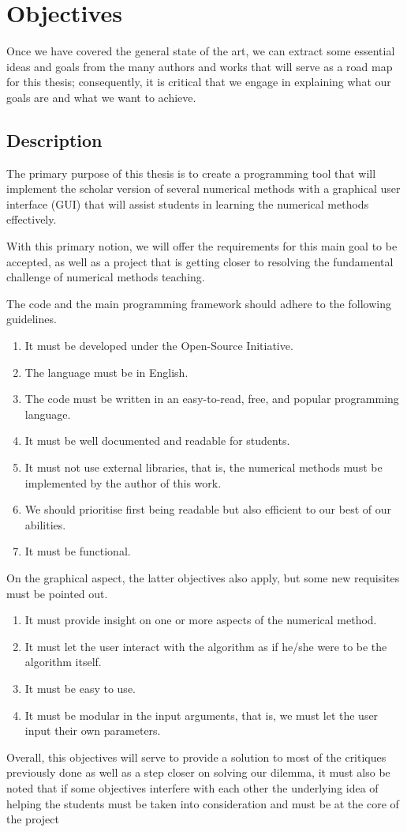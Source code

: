 \chapter{Objectives}
Once we have covered the general state of the art, we can extract some essential ideas and goals from the many authors and works that will serve as a road map for this thesis; consequently, it is critical that we engage in explaining what our goals are and what we want to achieve.

\section{Description}
The primary purpose of this thesis is to create a programming tool that will implement the scholar version of several numerical methods with a graphical user interface (GUI) that will assist students in learning the numerical methods effectively.

With this primary notion, we will offer the requirements for this main goal to be accepted, as well as a project that is getting closer to resolving the fundamental challenge of numerical methods teaching.

The code and the main programming framework should adhere to the following guidelines.
\begin{enumerate}
    \item It must be developed under the Open-Source Initiative.
    \item The language must be in English.
    \item The code must be written in an easy-to-read, free, and popular programming language.
    \item It must be well documented and readable for students.
    \item It must not use external libraries, that is, the numerical methods must be implemented by the author of this work.
    \item We should prioritise first being readable but also efficient to our best of our abilities.
    \item It must be functional.
\end{enumerate}

On the graphical aspect, the latter objectives also apply, but some new requisites must be pointed out.
\begin{enumerate}
    \item It must provide insight on one or more aspects of the numerical method.
    \item It must let the user interact with the algorithm as if he/she were to be the algorithm itself.
    \item It must be easy to use.
    \item It must be modular in the input arguments, that is, we must let the user input their own parameters.
\end{enumerate}

Overall, this objectives will serve to provide a solution to most of the critiques previously done as well as a step closer on solving our dilemma, it must also be noted that if some objectives interfere with each other the underlying idea of helping the students must be taken into consideration and must be at the core of the project
